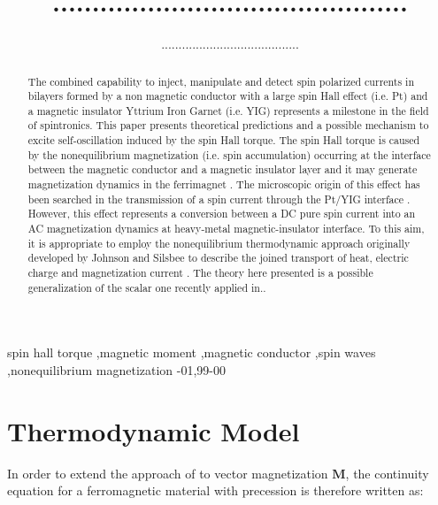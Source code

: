 \documentclass[twocolumn, final]{elsarticle}
\begin{document}
\begin{frontmatter}
\title{.............................................}

\author{........................................}
\address{Istituto Nazionale di Ricerca Metrologica (I.N.Ri.M.), Strada delle Cacce, 91, 10135 Torino, ITALY}

\begin{abstract}

The combined capability to inject, manipulate and detect spin polarized currents in bilayers formed by a non magnetic conductor with a large 
spin Hall effect (i.e. Pt) and a magnetic insulator Yttrium Iron Garnet (i.e. YIG) represents a milestone in the field of spintronics. This paper 
presents theoretical predictions and a possible mechanism to excite  self-oscillation induced by the spin Hall torque. The spin Hall torque is 
caused by the nonequilibrium magnetization (i.e. spin accumulation) occurring at the interface between the magnetic conductor and a 
magnetic insulator  layer and it may generate magnetization dynamics in the ferrimagnet \cite{collet2016generation}. The microscopic origin 
of this effect has been searched in the transmission of a spin current through the Pt/YIG interface \cite{tserkovnyak2002spin}. However,  
this effect represents a conversion between a DC pure spin current into an AC magnetization dynamics at heavy-metal magnetic-insulator 
interface. To this aim, it is appropriate to employ the nonequilibrium thermodynamic approach originally developed by Johnson and Silsbee 
to describe the joined transport of heat, electric charge and magnetization current \cite{johnson1987thermodynamic}. The theory here 
presented is a possible generalization of the scalar one recently applied in.\cite{basso2016nonequilibrium, basso2016thermodynamic}. 
\end{abstract}

\begin{keyword}
spin hall torque \sep magnetic moment \sep magnetic conductor \sep spin waves \sep nonequilibrium magnetization 
-01\sep  99-00
\end{keyword}
\end{frontmatter}
\linenumbers

\section{Thermodynamic Model}
In order to extend the approach of \cite{johnson1987thermodynamic, basso2016nonequilibrium, basso2016thermodynamic} to vector 
magnetization $\mathbf{M}$, the continuity equation for a ferromagnetic material with precession is therefore written as:
\end{document}
